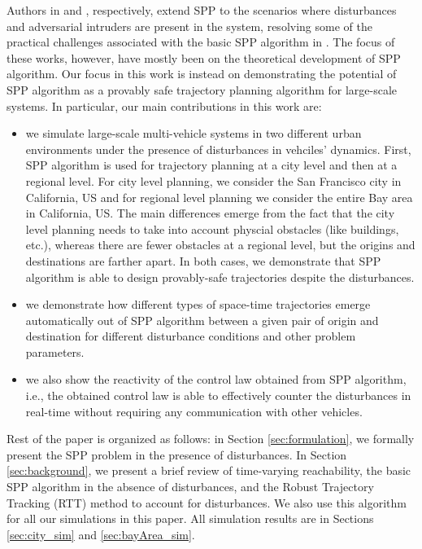 Authors in \cite{Bansal2017} and \cite{chen2016robust}, respectively, extend SPP to the scenarios where disturbances and adversarial intruders are present in the system, resolving some of the practical challenges associated with the basic SPP algorithm in \cite{Chen15c}. The focus of these works, however, have mostly been on the theoretical development of SPP algorithm. Our focus in this work is instead on demonstrating the potential of SPP algorithm as a provably safe trajectory planning algorithm for large-scale systems. In particular, our main contributions in this work are:
\begin{itemize}
\item we simulate large-scale multi-vehicle systems in two different urban environments under the presence of disturbances in vehciles' dynamics. First, SPP algorithm is used for trajectory planning at a city level and then at a regional level. For city level planning, we consider the San Francisco city in California, US and for regional level planning we consider the entire Bay area in California, US. The main differences emerge from the fact that the city level planning needs to take into account physcial obstacles (like buildings, etc.), whereas there are fewer obstacles at a regional level, but the origins and destinations are farther apart. In both cases, we demonstrate that SPP algorithm is able to design provably-safe trajectories despite the disturbances.
\item we demonstrate how different types of space-time trajectories emerge automatically out of SPP algorithm between a given pair of origin and destination for different disturbance conditions and other problem parameters.
\item we also show the reactivity of the control law obtained from SPP algorithm, i.e., the obtained control law is able to effectively counter the disturbances in real-time without requiring any communication with other vehicles.      
\end{itemize}

Rest of the paper is organized as follows: in Section \ref{sec:formulation}, we formally present the SPP problem in the presence of disturbances. In Section \ref{sec:background}, we present a brief review of time-varying reachability, the basic SPP algorithm \cite{Chen15c} in the absence of disturbances, and the Robust Trajectory Tracking (RTT) method \cite{Bansal2017} to account for disturbances. We also use this algorithm for all our simulations in this paper. All simulation results are in Sections \ref{sec:city_sim} and \ref{sec:bayArea_sim}.